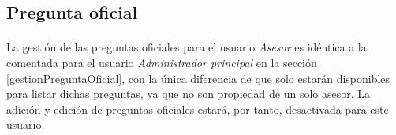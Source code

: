 \subsection{Pregunta oficial}

  \paragraph{}La gestión de las preguntas oficiales para el
  usuario \textit{Asesor} es idéntica a la comentada para el usuario
  \textit{Administrador principal} en la sección \ref{gestionPreguntaOficial},
  con la única diferencia de que solo estarán disponibles para listar dichas
  preguntas, ya que no son propiedad de un solo asesor. La adición y edición
  de preguntas oficiales estará, por tanto, desactivada para este usuario.